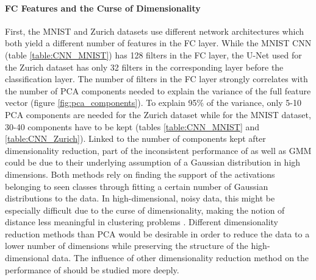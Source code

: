 \documentclass[10pt]{article}
\begin{document}
\paragraph{\gls{FC} Features and the Curse of Dimensionality}  First, the MNIST and Zurich datasets use different network architectures which both yield a different number of features in the \gls{FC} layer. While the \gls{MNIST} \gls{CNN} (table \ref{table:CNN_MNIST}) has 128 filters in the \gls{FC} layer, the U-Net used for the Zurich dataset has only 32 filters in the corresponding layer before the classification layer. The number of filters in the \gls{FC} layer strongly correlates with the number of \gls{PCA} components needed to explain the variance of the full feature vector (figure \ref{fig:pca_components}). To explain 95\% of the variance, only 5-10 \gls{PCA} components are needed for the Zurich dataset while for the \gls{MNIST} dataset, 30-40 components have to be kept (tables \ref{table:CNN_MNIST} and \ref{table:CNN_Zurich}). Linked to the number of components kept after dimensionality reduction, part of the inconsistent performance of  as well as \gls{GMM} could be due to their underlying assumption of a Gaussian distribution in high dimensions. Both methods rely on finding the support of the activations belonging to seen classes through fitting a certain number of Gaussian distributions to the data. In high-dimensional, noisy data, this might be especially difficult due to the curse of dimensionality, making the notion of distance less meaningful in clustering problems \cite{Hinneburg2000WhatIT}. Different dimensionality reduction methods than \gls{PCA} would be desirable in order to reduce the data to a lower number of dimensions while preserving the structure of the high-dimensional data. The influence of other dimensionality reduction method on the performance of  should be studied more deeply.

\end{document}
